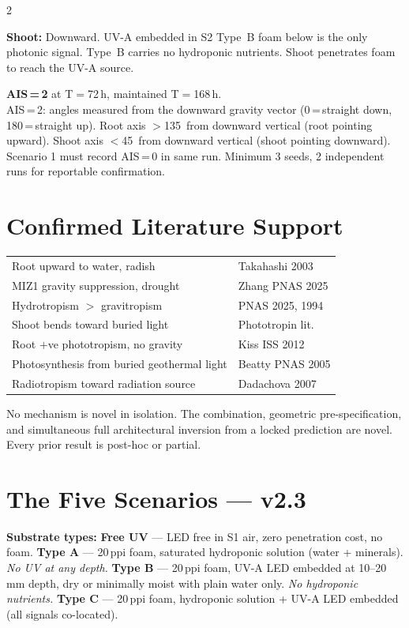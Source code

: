 \documentclass[8pt, a4paper]{article}
\begin{document}
\begin{multicols}{2}
{\textbf{Shoot:} Downward. UV-A embedded in S2 Type~B foam below
is the only photonic signal. Type~B carries no hydroponic nutrients.
Shoot penetrates foam to reach the UV-A source.

\textbf{AIS\,=\,2} at T$=$72\,h, maintained T$=$168\,h.\\
{\footnotesize AIS\,=\,2: angles measured from the downward gravity
vector (0\textdegree\,=\,straight down, 180\textdegree\,=\,straight up).
Root axis $>$135\textdegree\ from downward vertical (root pointing upward).
Shoot axis $<$45\textdegree\ from downward vertical (shoot pointing downward).
Scenario 1 must record AIS\,=\,0 in same run.
Minimum 3 seeds, 2 independent runs for reportable confirmation.}
}

\section{Confirmed Literature Support}
{\footnotesize
\begin{tabular}{p{3.6cm}p{2.0cm}}
Root upward to water, radish & Takahashi 2003 \\
MIZ1 gravity suppression, drought & Zhang PNAS 2025 \\
Hydrotropism $>$ gravitropism & PNAS 2025, 1994 \\
Shoot bends toward buried light & Phototropin lit. \\
Root $+$ve phototropism, no gravity & Kiss ISS 2012 \\
Photosynthesis from buried geothermal light & Beatty PNAS 2005 \\
Radiotropism toward radiation source & Dadachova 2007 \\
\end{tabular}

\vspace{0.1em}
No mechanism is novel in isolation. The combination,
geometric pre-specification, and simultaneous full architectural
inversion from a locked prediction are novel.
Every prior result is post-hoc or partial.
}

\columnbreak


\section{The Five Scenarios --- v2.3}
{\footnotesize
\textbf{Substrate types:}
\textbf{Free UV} --- LED free in S1 air, zero penetration cost, no foam.
\textbf{Type A} --- 20\,ppi foam, saturated hydroponic solution
(water + minerals). \textit{No UV at any depth.}
\textbf{Type B} --- 20\,ppi foam, UV-A LED embedded at 10--20\,mm depth,
dry or minimally moist with plain water only.
\textit{No hydroponic nutrients.}
\textbf{Type C} --- 20\,ppi foam, hydroponic solution + UV-A LED
embedded (all signals co-located).

}
\end{multicols}
\end{document}
